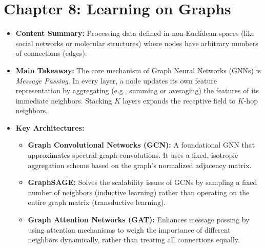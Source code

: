 \section*{Chapter 8: Learning on Graphs}
\begin{itemize}
    \item \textbf{Content Summary:} Processing data defined in non-Euclidean spaces (like social networks or molecular structures) where nodes have arbitrary numbers of connections (edges).
    \item \textbf{Main Takeaway:} The core mechanism of Graph Neural Networks (GNNs) is \textit{Message Passing}. In every layer, a node updates its own feature representation by aggregating (e.g., summing or averaging) the features of its immediate neighbors. Stacking $K$ layers expands the receptive field to $K$-hop neighbors.
    \item \textbf{Key Architectures:}
    \begin{itemize}
        \item \textbf{Graph Convolutional Networks (GCN):} A foundational GNN that approximates spectral graph convolutions. It uses a fixed, isotropic aggregation scheme based on the graph's normalized adjacency matrix.
        \item \textbf{GraphSAGE:} Solves the scalability issues of GCNs by sampling a fixed number of neighbors (inductive learning) rather than operating on the entire graph matrix (transductive learning).
        \item \textbf{Graph Attention Networks (GAT):} Enhances message passing by using attention mechanisms to weigh the importance of different neighbors dynamically, rather than treating all connections equally.
    \end{itemize}
\end{itemize}

